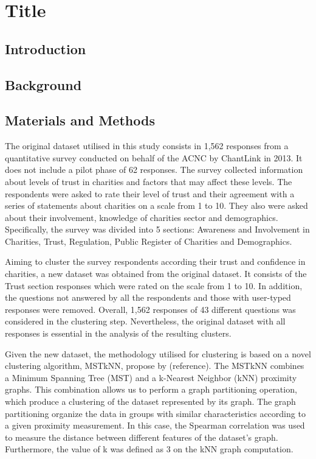 \documentclass{article}
\begin{document}
\section{Title}

\subsection{Introduction}

\subsection{Background}

\subsection{Materials and Methods}

The original dataset utilised in this study consists in 1,562 responses from a
quantitative survey conducted on behalf of the ACNC by ChantLink in 2013. It
does not include a pilot phase of 62 responses. The survey collected information
about levels of trust in charities and factors that may affect these levels. The
respondents were asked to rate their level of trust and their agreement with a
series of statements about charities on a scale from 1 to 10. They also were
asked about their involvement, knowledge of charities sector and demographics.
Specifically, the survey was divided into 5 sections: Awareness and Involvement
in Charities, Trust, Regulation, Public Register of Charities and Demographics.

Aiming to cluster the survey respondents according their trust and confidence in
charities, a new dataset was obtained from the original dataset. It
consists of the Trust section responses which were rated on the scale from 1 to
10. In addition, the questions not answered by all the respondents and those
with user-typed responses were removed. Overall, 1,562 responses of 43
different questions was considered in the clustering step. Nevertheless, the
original dataset with all responses is essential in the analysis of the
resulting clusters.

Given the new dataset, the methodology utilised for clustering is based on a
novel clustering algorithm, MSTkNN, propose by (reference). The MSTkNN combines
a Minimum Spanning Tree (MST) and a k-Nearest Neighbor (kNN) proximity graphs.
This combination allows us to perform a graph partitioning operation, which
produce a clustering of the dataset represented by its graph. The graph
partitioning organize the data in groups with similar characteristics according
to a given proximity measurement. In this case, the Spearman correlation was
used to measure the distance between different features of the dataset's graph.
Furthermore, the value of k was defined as 3 on the kNN graph computation. 
\end{document}

